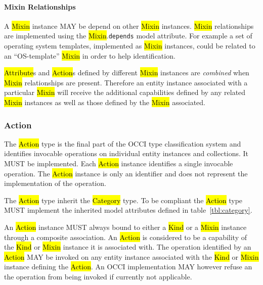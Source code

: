 \documentclass[10pt,a4paper]{article}
\begin{document}
\paragraph*{Mixin Relationships}

A \hl{Mixin} instance MAY be depend on other \hl{Mixin} instances.
\hl{Mixin} relationships are implemented using the \hl{Mixin}.{\tt depends}
model attribute.
For example a set of operating
system templates, implemented as \hl{Mixin} instances, could be
related to an ``OS-template'' \hl{Mixin} in order to help
identification.

\hl{Attribute}s and \hl{Action}s defined by different \hl{Mixin} instances
are {\em combined} when \hl{Mixin} relationships are present. Therefore an
entity instance associated with a particular \hl{Mixin} will receive
the additional capabilities defined by any related \hl{Mixin}
instances as well as those defined by the \hl{Mixin} associated.


\subsubsection{Action}
The \hl{Action} type is the final part of the OCCI type classification system
and identifies invocable operations on individual entity instances and collections.
It MUST be implemented.
Each \hl{Action} instance identifies a single invocable operation.
The \hl{Action} instance is only an identifier and does not represent the
implementation of the operation.

The \hl{Action} type inherit the \hl{Category} type. To be compliant
the \hl{Action} type MUST implement the inherited model attributes defined in
table~\ref{tbl:category}.


An \hl{Action} instance MUST always bound to either a \hl{Kind} or a \hl{Mixin}
instance through a composite association. An \hl{Action} is considered
to be a capability of the \hl{Kind} or \hl{Mixin} instance it is
associated with.  The operation identified by an \hl{Action} MAY be invoked on
any entity
instance associated with the \hl{Kind} or \hl{Mixin} instance defining
the \hl{Action}. An OCCI implementation MAY however refuse an
the operation from being invoked if currently not applicable.
\end{document}
